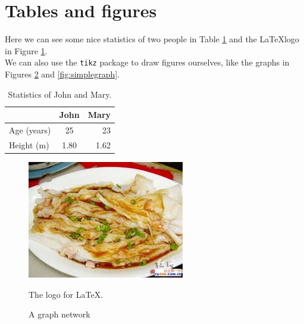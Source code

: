 \documentclass[a4paper,12pt]{article}
\begin{document}
\section{Tables and figures}
Here we can see some nice statistics of two people in Table \ref{table:johnmary} and the \LaTeX logo in Figure \ref{fig:latexlogo}. \\%
We can also use the \texttt{tikz} package to draw figures ourselves, like the graphs in Figures \ref{fig:graph} and \ref{fig:simplegraph}.

\begin{table}[!htpb]
\centering
{\begin{tabular}{|l|c|r|}
\hline
 & John & Mary\\
\hline
Age (years)	& 25   & 23 \\
Height (m)	& 1.80 & 1.62\\
\hline
\end{tabular}}
\caption{Statistics of John and Mary.
\label{table:johnmary}}
\end{table}

\begin{figure}[!htpb]
\centering
{\includegraphics[scale=0.1]{kill_for_this}}
\caption{The logo for \LaTeX.
\label{fig:latexlogo}}
\end{figure}

\begin{figure}[!htpb]
\centering
{\scriptsize
{}
}
\caption{A graph network
\label{fig:graph}}
\end{figure}
\end{document}

